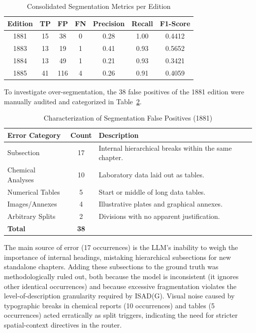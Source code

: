 \documentclass[conference]{IEEEtran}
\begin{document}
\begin{table}[htbp]
\caption{Consolidated Segmentation Metrics per Edition}
\label{tab:metricas_gerais}
\centering
\footnotesize
\begin{tabular}{|c|c|c|c|c|c|c|}
\hline
\textbf{Edition} & \textbf{TP} & \textbf{FP} & \textbf{FN} & \textbf{Precision} & \textbf{Recall} & \textbf{F1-Score} \\
\hline
1881 & 15 & 38 & 0 & 0.28 & 1.00 & 0.4412 \\
\hline
1883 & 13 & 19 & 1 & 0.41 & 0.93 & 0.5652 \\
\hline
1884 & 13 & 49 & 1 & 0.21 & 0.93 & 0.3421 \\
\hline
1885 & 41 & 116 & 4 & 0.26 & 0.91 & 0.4059 \\
\hline
\end{tabular}
\end{table}

To investigate over-segmentation, the 38 false positives of the 1881 edition were manually audited and categorized in Table~\ref{tab:falsos_positivos}.

\begin{table}[htbp]
\caption{Characterization of Segmentation False Positives (1881)}
\label{tab:falsos_positivos}
\centering
\footnotesize
\begin{tabular}{|l|c|p{4.2cm}|}
\hline
\textbf{Error Category} & \textbf{Count} & \textbf{Description} \\
\hline
Subsection & 17 & Internal hierarchical breaks within the same chapter. \\
\hline
Chemical Analyses & 10 & Laboratory data laid out as tables. \\
\hline
Numerical Tables & 5 & Start or middle of long data tables. \\
\hline
Images/Annexes & 4 & Illustrative plates and graphical annexes. \\
\hline
Arbitrary Splits & 2 & Divisions with no apparent justification. \\
\hline
\textbf{Total} & \textbf{38} & \\
\hline
\end{tabular}
\end{table}

The main source of error (17 occurrences) is the LLM's inability to weigh the importance of internal headings, mistaking hierarchical subsections for new standalone chapters. Adding these subsections to the ground truth was methodologically ruled out, both because the model is inconsistent (it ignores other identical occurrences) and because excessive fragmentation violates the level-of-description granularity required by ISAD(G). Visual noise caused by typographic breaks in chemical reports (10 occurrences) and tables (5 occurrences) acted erratically as split triggers, indicating the need for stricter spatial-context directives in the router.
\end{document}
